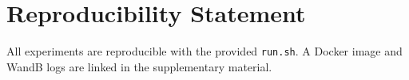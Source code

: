 \section*{Reproducibility Statement}
All experiments are reproducible with the provided \texttt{run.sh}.  A Docker image and WandB logs are linked in the supplementary material.